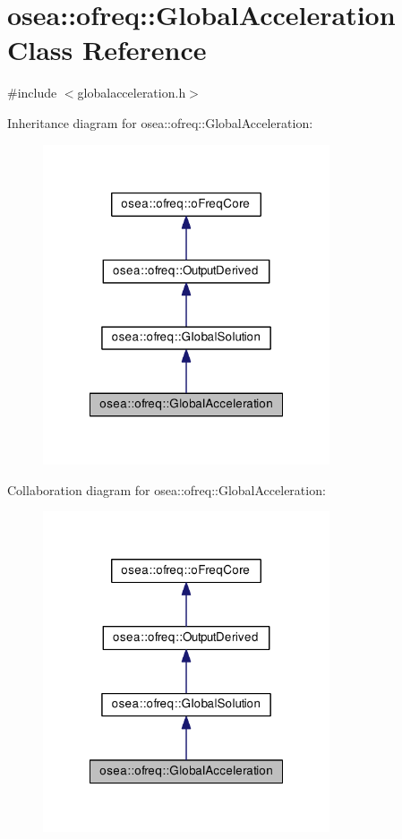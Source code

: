 \hypertarget{classosea_1_1ofreq_1_1_global_acceleration}{\section{osea\-:\-:ofreq\-:\-:Global\-Acceleration Class Reference}
\label{classosea_1_1ofreq_1_1_global_acceleration}
}


{\ttfamily \#include $<$globalacceleration.\-h$>$}



Inheritance diagram for osea\-:\-:ofreq\-:\-:Global\-Acceleration\-:
\nopagebreak
\begin{figure}[H]
\begin{center}
\leavevmode
\includegraphics[width=240pt]{classosea_1_1ofreq_1_1_global_acceleration__inherit__graph}
\end{center}
\end{figure}


Collaboration diagram for osea\-:\-:ofreq\-:\-:Global\-Acceleration\-:
\nopagebreak
\begin{figure}[H]
\begin{center}
\leavevmode
\includegraphics[width=240pt]{classosea_1_1ofreq_1_1_global_acceleration__coll__graph}
\end{center}
\end{figure}
